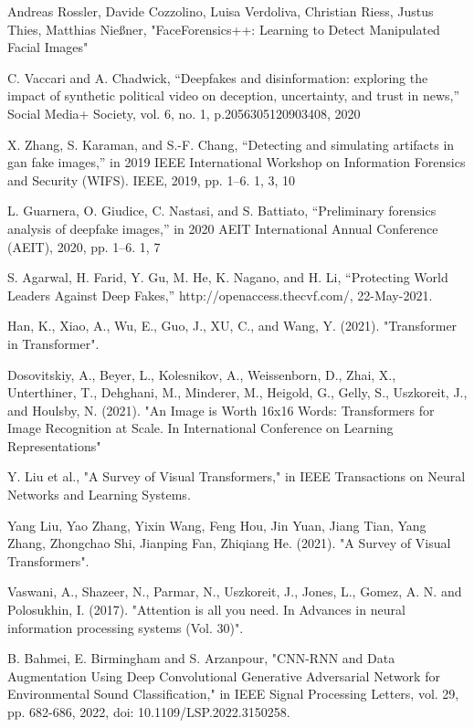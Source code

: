 \begin{thebibliography}{99}

     Andreas Rossler, Davide Cozzolino, Luisa Verdoliva, Christian Riess, Justus Thies, Matthias Nießner, "FaceForensics++: Learning to Detect Manipulated Facial Images"

     C. Vaccari and A. Chadwick, “Deepfakes and disinformation: exploring the impact of synthetic political video on deception, uncertainty, and trust in news,” Social Media+ Society, vol. 6, no. 1, p.2056305120903408, 2020
    
     X. Zhang, S. Karaman, and S.-F. Chang, “Detecting and simulating artifacts in gan fake images,” in 2019 IEEE International Workshop on Information Forensics and Security (WIFS). IEEE, 2019, pp. 1–6. 1, 3, 10
    
      L. Guarnera, O. Giudice, C. Nastasi, and S. Battiato, “Preliminary forensics analysis of deepfake images,” in 2020 AEIT International Annual Conference (AEIT), 2020, pp. 1–6. 1, 7

     S. Agarwal, H. Farid, Y. Gu, M. He, K. Nagano, and H. Li, “Protecting World 
    Leaders Against Deep Fakes,” http://openaccess.thecvf.com/,  22-May-2021.
       
     Han, K., Xiao, A., Wu, E., Guo, J., XU, C., and Wang, Y. (2021). "Transformer in Transformer".
    
     Dosovitskiy, A., Beyer, L., Kolesnikov, A., Weissenborn, D., Zhai, X., Unterthiner, T., Dehghani, M., Minderer, M., Heigold, G., Gelly, S., Uszkoreit, J., and Houlsby, N. (2021). "An Image is Worth 16x16 Words: Transformers for Image Recognition at Scale. In International Conference on Learning Representations"

     Y. Liu et al., "A Survey of Visual Transformers," in IEEE Transactions on Neural Networks and Learning Systems.

     Yang Liu, Yao Zhang, Yixin Wang, Feng Hou, Jin Yuan,
    Jiang Tian, Yang Zhang, Zhongchao Shi, Jianping Fan, Zhiqiang He. (2021). "A Survey of Visual Transformers".

     Vaswani, A., Shazeer, N., Parmar, N., Uszkoreit, J., Jones, L., Gomez, A. N. and Polosukhin, I. (2017). "Attention is all you need. In Advances in neural information processing systems (Vol. 30)".

     B. Bahmei, E. Birmingham and S. Arzanpour, "CNN-RNN and Data Augmentation Using Deep Convolutional Generative Adversarial Network for Environmental Sound Classification," in IEEE Signal Processing Letters, vol. 29, pp. 682-686, 2022, doi: 10.1109/LSP.2022.3150258.


\end{thebibliography}
